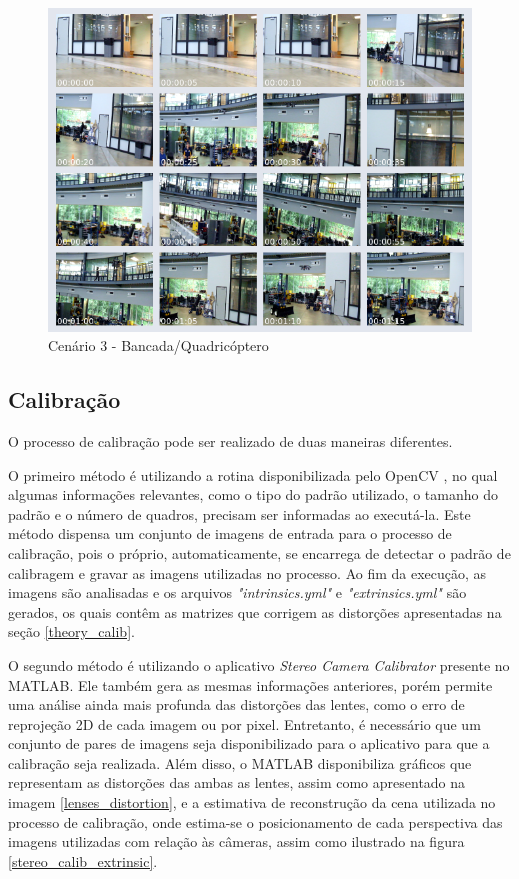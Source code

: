 \begin{figure}[H]
	\centering
	\includegraphics[scale=0.55]{./Resources/thumbs/thumb_video15.png}
	\caption{Cenário 3 - Bancada/Quadricóptero}
	\label{thumb_video15}
\end{figure}


\subsection{Calibração}
O processo de calibração pode ser realizado de duas maneiras diferentes. 

O primeiro método é utilizando a rotina disponibilizada pelo OpenCV \cite{OpenCVCalibrationTutorial}, no qual algumas informações relevantes, como o tipo do padrão utilizado, o tamanho do padrão e o número de quadros, precisam ser informadas ao executá-la. Este método dispensa um conjunto de imagens de entrada para o processo de calibração, pois o próprio, automaticamente, se encarrega de detectar o padrão de calibragem e gravar as imagens utilizadas no processo. Ao fim da execução, as imagens são analisadas e os arquivos \textit{"intrinsics.yml"} e \textit{"extrinsics.yml"} são gerados, os quais contêm as matrizes que corrigem as distorções apresentadas na seção \ref{theory_calib}.

O segundo método é utilizando o aplicativo \textit{Stereo Camera Calibrator} presente no MATLAB. Ele também gera as mesmas informações anteriores, porém permite uma análise ainda mais profunda das distorções das lentes, como o erro de reprojeção 2D de cada imagem ou por pixel. Entretanto, é necessário que um conjunto de pares de imagens seja disponibilizado para o aplicativo para que a calibração seja realizada. Além disso, o MATLAB disponibiliza gráficos que representam as distorções das ambas as lentes, assim como apresentado na imagem \ref{lenses_distortion}, e a estimativa de reconstrução da cena utilizada no processo de calibração, onde estima-se o posicionamento de cada perspectiva das imagens utilizadas com relação às câmeras, assim como ilustrado na figura \ref{stereo_calib_extrinsic}.


